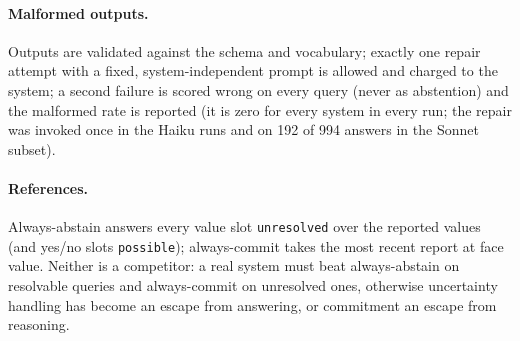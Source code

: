 \paragraph{Malformed outputs.} Outputs are validated against the schema and vocabulary; exactly one repair attempt with a fixed, system-independent prompt is allowed and charged to the system; a second failure is scored wrong on every query (never as abstention) and the malformed rate is reported (it is zero for every system in every run; the repair was invoked once in the Haiku runs and on 192 of 994 answers in the Sonnet subset).

\paragraph{References.} Always-abstain answers every value slot \texttt{unresolved} over the reported values (and yes/no slots \texttt{possible}); always-commit takes the most recent report at face value. Neither is a competitor: a real system must beat always-abstain on resolvable queries and always-commit on unresolved ones, otherwise uncertainty handling has become an escape from answering, or commitment an escape from reasoning.
